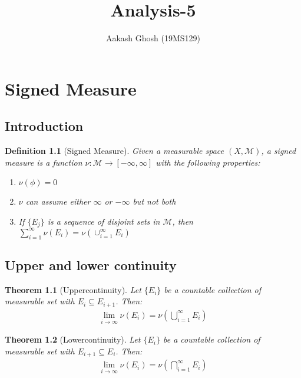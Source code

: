 \documentclass{tufte-book}
\title{Analysis-5}
\author[Aakash Ghosh]{Aakash Ghosh (19MS129)}
\newtheorem{defn}{Definition}
\newtheorem{theorem}{Theorem}
\begin{document}
\maketitle




\tableofcontents



\chapter{Signed Measure}
\section{Introduction}
\begin{defn}[Signed Measure]
	Given a measurable space $(X,\mathcal{M})$, a signed measure is a function $\nu:\mathcal{M}\to[-\infty,\infty]$ with the following properties:
\begin{enumerate}
	\item $\nu(\phi)=0$
	\item $\nu$ can assume either $\infty$ or $-\infty$ but not both 
	\item If $\{E_j\}$ is a sequence of disjoint sets in $\mathcal{M}$, then $\sum_{i=1}^\infty \nu(E_i)=\nu\left(\cup_{i=1}^\infty E_i \right)$
\end{enumerate}
\end{defn}
\section{Upper and lower continuity}

\begin{theorem}[Uppercontinuity]
	Let $\{E_i\}$ be a countable collection of measurable set with $E_i\subseteq E_{i+1}$. Then:
	\begin{align}
		\lim_{i\to\infty}\nu(E_i)=\nu\left(\bigcup_{i=1}^\infty E_i\right)
	\end{align}
\end{theorem}

\begin{theorem}[Lowercontinuity]
	Let $\{E_i\}$ be a countable collection of measurable set with $E_{i+1}\subseteq E_{i}$. Then:
	\begin{align}
		\lim_{i\to\infty}\nu(E_i)=\nu\left(\bigcap_{i=1}^\infty E_i\right)
	\end{align}
\end{theorem}
\end{document}
